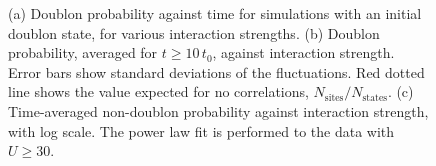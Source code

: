 \begin{figure}[ht]
    \centering
    \hfill
    \hfill
    \caption{(a) Doublon probability against time for simulations with an initial doublon state, for various interaction strengths. (b) Doublon probability, averaged for $t\geq 10\, t_0$, against interaction strength. Error bars show standard deviations of the fluctuations. Red dotted line shows the value expected for no correlations, $N_{\text{sites}}/N_{\text{states}}$. (c) Time-averaged non-doublon probability against interaction strength, with log scale. The power law fit is performed to the data with $U\geq30$.}
    \label{Fig:Doublon_Probability}
\end{figure}